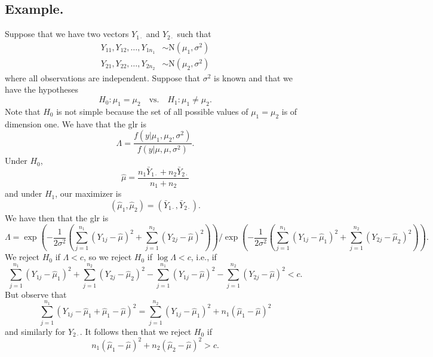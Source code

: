 \documentclass[titlepage]{article}
\begin{document}
\subsection{Example.} Suppose that we have two vectors $Y_{1\cdot}$ and $Y_{2\cdot}$ such that 
\begin{align*}
    Y_{11}, Y_{12}, \ldots, Y_{1n_{1}} &\sim \text{N}(\mu_{1}, \sigma^{2}) \\
    Y_{21}, Y_{22}, \ldots, Y_{2n_{2}} &\sim \text{N}(\mu_{2}, \sigma^{2})
\end{align*}
where all observations are independent. Suppose that $\sigma^{2}$ is known and that we have the hypotheses 
$$H_{0}: \mu_{1} = \mu_{2} \quad \text{vs.} \quad H_{1}: \mu_{1} \neq \mu_{2}.$$
Note that $H_{0}$ is not simple because the set of all possible values of $\mu_{1} = \mu_{2}$ is of dimension one. We have that the glr is 
$$\Lambda = \frac{f(y|\mu_{1}, \mu_{2}, \sigma^{2})}{f(y|\mu, \mu, \sigma^{2})}.$$
Under $H_{0}$, 
$$\hat{\mu} = \frac{n_{1}\bar{Y}_{1\cdot} + n_{2}\bar{Y}_{2\cdot}}{n_{1} + n_{2}}$$
and under $H_{1}$, our maximizer is 
$$(\hat{\mu}_{1}, \hat{\mu}_{2}) = (\bar{Y}_{1\cdot}, \bar{Y}_{2\cdot}).$$
We have then that the glr is 
$$\Lambda = \exp\left(-\frac{1}{2\sigma^{2}}\left(\sum_{j=1}^{n_{1}}(Y_{1j} - \hat{\mu})^{2} + \sum_{j=1}^{n_{2}}(Y_{2j} - \hat{\mu})^{2}\right)\right) / \exp\left(-\frac{1}{2\sigma^{2}}\left(\sum_{j=1}^{n_{1}}(Y_{1j} - \hat{\mu}_{1})^{2} + \sum_{j=1}^{n_{2}}(Y_{2j} - \hat{\mu}_{2})^{2}\right)\right).$$
We reject $H_{0}$ if $\Lambda < c$, so we reject $H_{0}$ if $\log\Lambda < c$, i.e., if 
$$\sum_{j=1}^{n_{1}}(Y_{1j} - \hat{\mu}_{1})^{2} + \sum_{j=1}^{n_{2}}(Y_{2j} - \hat{\mu}_{2})^{2} - \sum_{j=1}^{n_{1}}(Y_{1j} - \hat{\mu})^{2} - \sum_{j=1}^{n_{2}}(Y_{2j} - \hat{\mu})^{2} < c.$$
But observe that 
$$\sum_{j=1}^{n_{1}}(Y_{1j} - \hat{\mu}_{1} + \hat{\mu}_{1} - \hat{\mu})^{2} = \sum_{j=1}^{n_{2}}(Y_{1j} - \hat{\mu}_{1})^{2} + n_{1}(\hat{\mu}_{1} - \hat{\mu})^{2}$$
and similarly for $Y_{2\cdot}$. It follows then that we reject $H_{0}$ if 
$$n_{1}(\hat{\mu}_{1} - \hat{\mu})^{2} + n_{2}(\hat{\mu}_{2} - \hat{\mu})^{2} > c.$$
\end{document}
